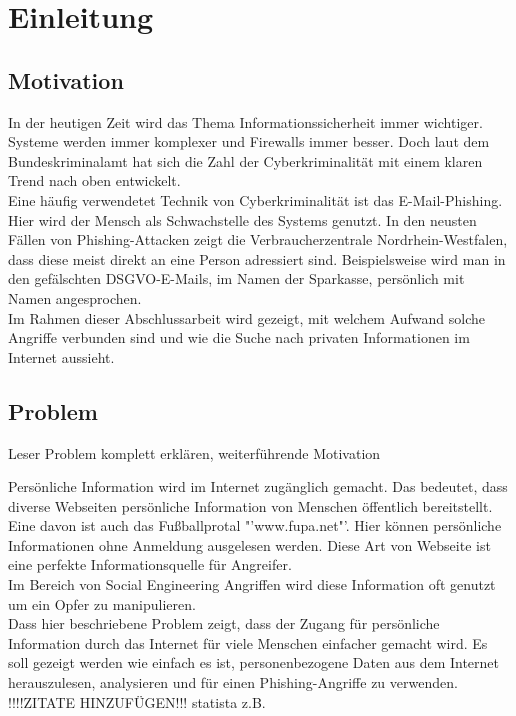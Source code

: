 \chapter{Einleitung}
\label{cha:einleitung}


\section{Motivation}
\label {sec:Motivation}
In der heutigen Zeit wird das Thema Informationssicherheit immer wichtiger. Systeme werden immer komplexer und Firewalls immer besser.
Doch laut dem Bundeskriminalamt hat sich die Zahl der Cyberkriminalität mit einem klaren Trend nach oben entwickelt. \cite{Cyberkriminalitaet}\\
Eine häufig verwendetet Technik von Cyberkriminalität ist das E-Mail-Phishing. Hier wird der Mensch als Schwachstelle des Systems genutzt. In den neusten Fällen von Phishing-Attacken zeigt die Verbraucherzentrale Nordrhein-Westfalen, dass diese meist direkt an eine Person adressiert sind. Beispielsweise wird man in den gefälschten DSGVO-E-Mails, im Namen der Sparkasse, persönlich mit Namen angesprochen. \cite{VerbraucherzentraleNW} \\
Im Rahmen dieser Abschlussarbeit wird gezeigt, mit welchem Aufwand solche Angriffe verbunden sind und wie die Suche nach privaten Informationen im Internet aussieht.

\section{Problem}
Leser Problem komplett erklären, weiterführende Motivation

Persönliche Information wird im Internet zugänglich gemacht. Das bedeutet, dass diverse Webseiten persönliche Information von Menschen öffentlich bereitstellt. Eine davon ist auch das Fußballprotal "'www.fupa.net"'. Hier können persönliche Informationen ohne Anmeldung ausgelesen werden. Diese Art von Webseite ist eine perfekte Informationsquelle für Angreifer.\\
Im Bereich von Social Engineering Angriffen wird diese Information oft genutzt um ein Opfer zu manipulieren.\\
Dass hier beschriebene Problem zeigt, dass der Zugang für persönliche Information durch das Internet für viele Menschen einfacher gemacht wird. Es soll gezeigt werden wie einfach es ist, personenbezogene Daten aus dem Internet herauszulesen, analysieren und für einen Phishing-Angriffe zu verwenden.
!!!!ZITATE HINZUFÜGEN!!! statista z.B.

